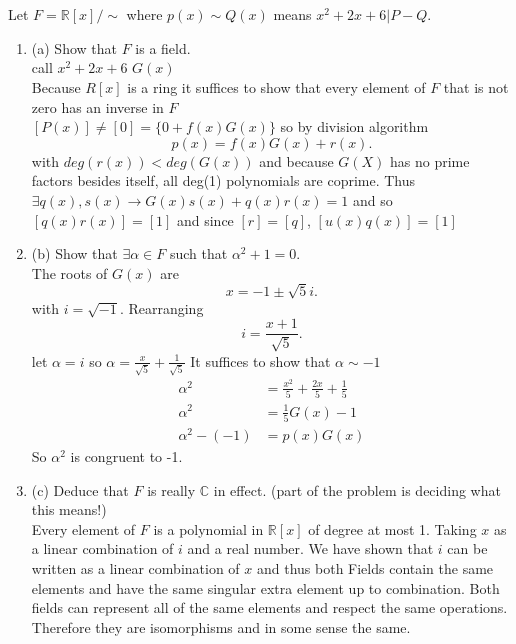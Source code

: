 \documentclass{article}
\begin{document}
    \section{}
    Let $F = \mathbb{R}[x]/\sim$ where  $p(x) \sim Q(x)$ means $x^2+2x+6|P-Q$.\\
    \begin{enumerate}
        \item (a) Show that $F$ is a field.\\
            call $x^2+2x+6$ $G(x)$\\
            Because $R[x]$ is a ring it suffices to show that every element of $F$ that is not zero has an inverse in $F$\\
            $[P(x)] \ne [0] = \{0 + f(x)G(x)\}$ so by division algorithm
            \[
            p(x) = f(x)G(x) + r(x)
            .\] 
            with $deg(r(x)) < deg(G(x))$ and because $G(X)$ has no prime factors besides itself, all deg(1) polynomials are coprime.
            Thus $\exists q(x), s(x) \rightarrow G(x)s(x) + q(x)r(x) = 1$ and so $[q(x)r(x)] = [1]$ and since  $[r] = [q]$,  $[u(x)q(x)] = [1]$
        \item (b) Show that $\exists \alpha \in F$ such that $\alpha^2+1 = 0$.\\
            The roots of $G(x)$ are 
             \[
            x = -1 \pm \sqrt{5}i 
            .\] 
            with $i = \sqrt{-1}$. Rearranging
            \[
            i = \frac{x+1}{\sqrt{5}}
            .\] 
        let $\alpha = i$ so  $\alpha = \frac{x}{\sqrt{5}}+\frac{1}{\sqrt{5}}$
        It suffices to show that $\alpha \sim -1$ 
        \begin{align*}
            \alpha^2 &= \frac{x^2}{5} + \frac{2x}{5} + \frac{1}{5}\\
            \alpha^2 &= \frac{1}{5}G(x) - 1\\
            \alpha^2 - (-1) &= p(x)G(x)
        \end{align*}
        So $\alpha^2$ is congruent to -1.
        \item (c) Deduce that $F$ is really $ \mathbb{C}$ in effect. (part of the problem is deciding what this means!)\\
            Every element of $F$ is a polynomial in $ \mathbb{R}[x]$ of degree at most 1. Taking $x$ as a linear combination of $i$ and a real number.
            We have shown that $i$ can be written as a linear combination of $x$ and thus both Fields contain the same elements and have the same singular extra element up to combination.
            Both fields can represent all of the same elements and respect  the same operations. Therefore they are isomorphisms and in some sense the same.
    \end{enumerate}
\end{document}
